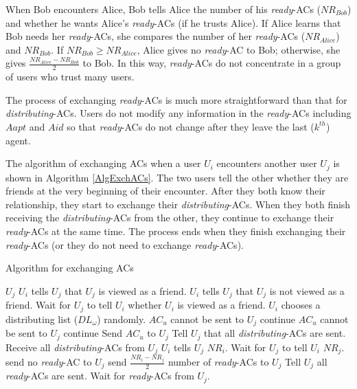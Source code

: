 When Bob encounters Alice, Bob tells Alice the number of his \textit{ready}-ACs (${NR}_{Bob}$) and whether he wants Alice's \textit{ready}-ACs (if he trusts Alice). If Alice learns that Bob needs her \textit{ready}-ACs, she compares the number of her \textit{ready}-ACs (${NR}_{Alice}$) and ${NR}_{Bob}$. If ${NR}_{Bob}\ge {NR}_{Alice}$, Alice gives no \textit{ready}-AC to Bob; otherwise, she gives $\frac{{NR}_{Alice}-{NR}_{Bob}}{2}$ to Bob. In this way, \textit{ready}-ACs do not concentrate in a group of users who trust many users. 

The process of exchanging \textit{ready}-ACs is much more straightforward than that for \textit{distributing}-ACs. Users do not modify any information in the \textit{ready}-ACs including $Aapt$ and $Aid$ so that \textit{ready}-ACs do not change after they leave the last ($k^{th}$) agent.

The algorithm of exchanging ACs when a user $U_i$ encounters another user $U_j$ is shown in Algorithm \ref{AlgExchACs}. The two users tell the other whether they are friends at the very beginning of their encounter. After they both know their relationship, they start to exchange their \textit{distributing}-ACs. When they both finish receiving the \textit{distributing}-ACs from the other, they continue to exchange their \textit{ready}-ACs at the same time. The process ends when they finish exchanging their \textit{ready}-ACs (or they do not need to exchange \textit{ready}-ACs).

\begin{algorithm} [hbtp]
\caption{Algorithm for exchanging ACs}\label{AlgExchACs}
\begin{algorithmic}[1]
 {$U_j$}
	\State $U_i$ tells $U_j$ that $U_j$ is viewed as a friend.
\Else
	\State $U_i$ tells $U_j$ that $U_j$ is not viewed as a friend.
\EndIf
\State Wait for $U_j$ to tell $U_i$ whether $U_i$ is viewed as a friend.
\State $U_i$ chooses a distributing list (${DL}_{\omega}$) randomly.
		\State ${AC}_u$ cannot be sent to $U_j$
		\State continue
	\EndIf
			\State ${AC}_u$ cannot be sent to $U_j$
			\State continue
		\EndIf
	\EndIf
	\State Send ${AC}_u$ to $U_j$
\EndFor
\State Tell $U_j$ that all \textit{distributing}-ACs are sent.
\State Receive all \textit{distributing}-ACs from $U_j$
	\State $U_i$ tells $U_j$ ${NR}_i$.
\EndIf
{}
	\State Wait for $U_j$ to tell $U_i$ ${NR}_j$.
		\State send no \textit{ready}-AC to $U_j$
	\Else
		\State send $\frac{{NR}_i-{NR}_j}{2}$ number of \textit{ready}-ACs to $U_j$
	\EndIf
	\State Tell $U_j$ all \textit{ready}-ACs are sent.
\EndIf
{}
	\State Wait for \textit{ready}-ACs from $U_j$.
\EndIf 
\EndProcedure

\end{algorithmic}
\end{algorithm}

